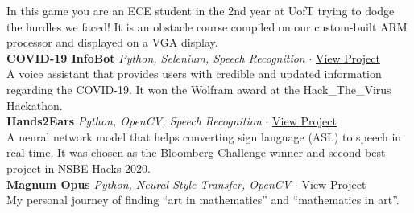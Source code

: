 \documentclass[a4paper]{article}
\begin{document}
In this game you are an ECE student in the 2nd year at UofT trying to dodge the hurdles we faced! It is an obstacle course compiled on our custom-built ARM processor and displayed on a VGA display.\\
\vspace*{2mm}
{\textbf{COVID-19 InfoBot}} {\sl Python, Selenium, Speech Recognition} $\cdot$ \href{https://tinyurl.com/ub8uyavj}{View Project} \\
A voice assistant that provides users with credible and updated information regarding the COVID-19. It won the Wolfram award at the Hack\_The\_Virus Hackathon.\\
\vspace*{2mm}
{\textbf{Hands2Ears}} {\sl Python, OpenCV, Speech Recognition} $\cdot$ \href{https://tinyurl.com/65ftaddu}{View Project} \\
A neural network model that helps converting sign language (ASL) to speech in real time. It was chosen as the Bloomberg Challenge winner and second best project in NSBE Hacks 2020.\\
\vspace*{2mm}
{\textbf{Magnum Opus}} {\sl Python, Neural Style Transfer, OpenCV} $\cdot$ \href{https://tinyurl.com/322atmp8}{View Project} \\
My personal journey of finding “art in mathematics” and “mathematics in art”.\\
\vspace*{2mm}
\end{document}
